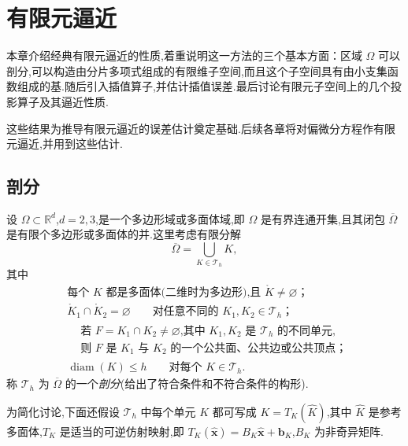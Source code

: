 \chapter{有限元逼近}\label{ch:3}

本章介绍经典有限元逼近的性质,着重说明这一方法的三个基本方面：区域 \(\Omega\) 可以剖分,可以构造由分片多项式组成的有限维子空间,而且这个子空间具有由小支集函数组成的基.随后引入插值算子,并估计插值误差.最后讨论有限元子空间上的几个投影算子及其逼近性质.

这些结果为推导有限元逼近的误差估计奠定基础.后续各章将对偏微分方程作有限元逼近,并用到这些估计.

\section{剖分}\label{sec:3.1}

设 \(\Omega\subset\mathbb R^d\),\(d=2,3\),是一个多边形域或多面体域,即 \(\Omega\) 是有界连通开集,且其闭包 \(\overline\Omega\) 是有限个多边形或多面体的并.这里考虑有限分解
\begin{equation}\label{eq:3.1.1}
  \overline\Omega=\bigcup_{K\in\mathcal T_h}K,
\end{equation}
其中
\begin{align}
  &\text{每个 \(K\) 都是多面体(二维时为多边形),且 \(\mathring K\ne\varnothing\)；}
  \label{eq:3.1.2}\\
  &\mathring K_1\cap\mathring K_2=\varnothing
    \qquad\text{对任意不同的 \(K_1,K_2\in\mathcal T_h\)；}
  \label{eq:3.1.3}\\
  &\begin{aligned}
    &\text{若 \(F=K_1\cap K_2\ne\varnothing\),其中 \(K_1,K_2\) 是 \(\mathcal T_h\) 的不同单元,}\\
    &\text{则 \(F\) 是 \(K_1\) 与 \(K_2\) 的一个公共面、公共边或公共顶点；}
  \end{aligned}
  \label{eq:3.1.4}\\
  &\operatorname{diam}(K)\le h\qquad\text{对每个 \(K\in\mathcal T_h\).}
  \label{eq:3.1.5}
\end{align}
称 \(\mathcal T_h\) 为 \(\overline\Omega\) 的一个\emph{剖分}(给出了符合条件和不符合条件的构形).

为简化讨论,下面还假设 \(\mathcal T_h\) 中每个单元 \(K\) 都可写成 \(K=T_K(\widehat K)\),其中 \(\widehat K\) 是参考多面体,\(T_K\) 是适当的可逆仿射映射,即 \(T_K(\widehat{\boldsymbol{x}})=B_K\widehat{\boldsymbol{x}}+\boldsymbol{b}_K\),\(B_K\) 为非奇异矩阵.

